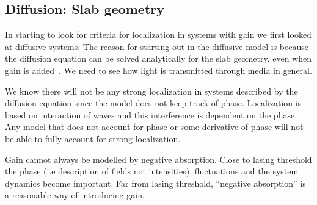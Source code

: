 
\subsection {Diffusion: Slab geometry}

In starting to look for criteria for localization in systems with gain we first looked at diffusive systems. The reason for starting out in the diffusive model is because the diffusion equation can be solved analytically for the slab geometry, even when gain is added~\cite{1993_Lisyansky_diffusint}. We need to see how light is transmitted through media in general. 

We know there will not be any strong localization in systems described by the diffusion equation since the model does not keep track of phase.  Localization is based on interaction of waves and this interference is dependent on the phase.  Any model that does not account for phase or some derivative of phase will not be able to fully account for strong localization.

Gain cannot always be modelled by negative absorption. Close to lasing threshold the phase (i.e description of fields not intensities), fluctuations and the system dynamics become important. Far from lasing threshold, ``negative absorption'' is a reasonable way of introducing gain.

